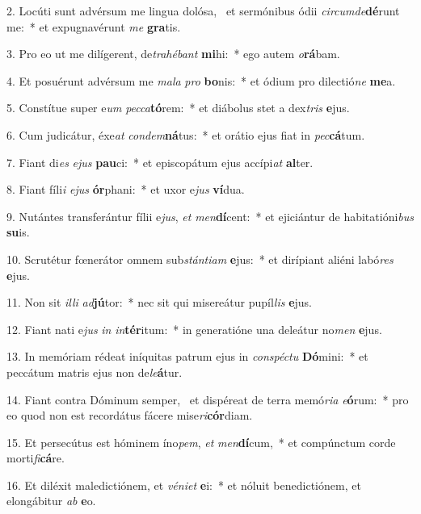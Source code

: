 2. Locúti sunt advérsum me lingua dolósa, \dag\  et sermónibus ódii \textit{cir}\textit{cum}\textit{de}\textbf{dé}runt me:~*  et expugnavérunt \textit{me} \textbf{gra}tis.\

3. Pro eo ut me dilígerent, de\textit{tra}\textit{hé}\textit{bant} \textbf{mi}hi:~*  ego autem \textit{o}\textbf{rá}bam.\

4. Et posuérunt advérsum me \textit{ma}\textit{la} \textit{pro} \textbf{bo}nis:~*  et ódium pro dilectió\textit{ne} \textbf{me}a.\

5. Constítue super e\textit{um} \textit{pec}\textit{ca}\textbf{tó}rem:~*  et diábolus stet a dex\textit{tris} \textbf{e}jus.\

6. Cum judicátur, éxe\textit{at} \textit{con}\textit{dem}\textbf{ná}tus:~*  et orátio ejus fiat in \textit{pec}\textbf{cá}tum.\

7. Fiant di\textit{es} \textit{e}\textit{jus} \textbf{pau}ci:~*  et episcopátum ejus accípi\textit{at} \textbf{al}ter.\

8. Fiant fíli\textit{i} \textit{e}\textit{jus} \textbf{ór}phani:~*  et uxor e\textit{jus} \textbf{ví}dua.\

9. Nutántes transferántur fílii e\textit{jus}, \textit{et} \textit{men}\textbf{dí}cent:~*  et ejiciántur de habitatióni\textit{bus} \textbf{su}is.\

10. Scrutétur fœnerátor omnem sub\textit{stán}\textit{ti}\textit{am} \textbf{e}jus:~*  et dirípiant aliéni labó\textit{res} \textbf{e}jus.\

11. Non sit \textit{il}\textit{li} \textit{ad}\textbf{jú}tor:~*  nec sit qui misereátur pupíl\textit{lis} \textbf{e}jus.\

12. Fiant nati e\textit{jus} \textit{in} \textit{in}\textbf{tér}itum:~*  in generatióne una deleátur no\textit{men} \textbf{e}jus.\

13. In memóriam rédeat iníquitas patrum ejus in \textit{con}\textit{spéc}\textit{tu} \textbf{Dó}mini:~*  et peccátum matris ejus non de\textit{le}\textbf{á}tur.\

14. Fiant contra Dóminum semper, \dag\  et dispéreat de terra memó\textit{ri}\textit{a} \textit{e}\textbf{ó}rum:~*  pro eo quod non est recordátus fácere mise\textit{ri}\textbf{cór}diam.\

15. Et persecútus est hóminem íno\textit{pem}, \textit{et} \textit{men}\textbf{dí}cum,~*  et compúnctum corde morti\textit{fi}\textbf{cá}re.\

16. Et diléxit maledictiónem, et \textit{vé}\textit{ni}\textit{et} \textbf{e}i:~*  et nóluit benedictiónem, et elongábitur \textit{ab} \textbf{e}o.\

